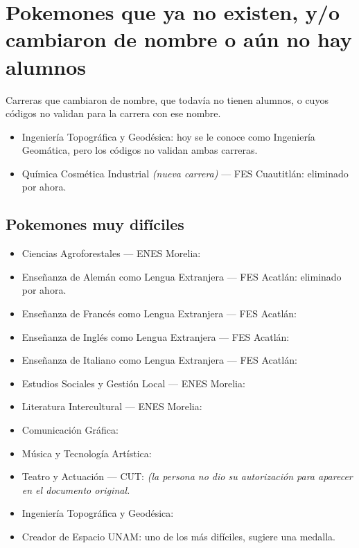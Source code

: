 \section{Pokemones que ya no existen, y/o cambiaron de nombre o aún no hay alumnos}
Carreras que cambiaron de nombre, que todavía no tienen alumnos, o cuyos códigos no validan para la carrera con ese nombre.

\begin{itemize}[leftmargin=*]
  \item Ingeniería Topográfica y Geodésica: hoy se le conoce como Ingeniería Geomática, pero los códigos no validan ambas carreras.
  \item Química Cosmética Industrial \emph{(nueva carrera)} --- FES Cuautitlán: eliminado por ahora.
\end{itemize}

\subsection*{Pokemones muy difíciles}
\begin{itemize}[leftmargin=*]
  \item Ciencias Agroforestales --- ENES Morelia: 
  \item Enseñanza de Alemán como Lengua Extranjera --- FES Acatlán: eliminado por ahora.
  \item Enseñanza de Francés como Lengua Extranjera --- FES Acatlán: 
  \item Enseñanza de Inglés como Lengua Extranjera --- FES Acatlán: 
  \item Enseñanza de Italiano como Lengua Extranjera --- FES Acatlán: 
  \item Estudios Sociales y Gestión Local --- ENES Morelia: 
  \item Literatura Intercultural --- ENES Morelia: 
  \item Comunicación Gráfica: 
  \item Música y Tecnología Artística: 
  \item Teatro y Actuación --- CUT:  \emph{(la persona no dio su autorización para aparecer en el documento original.}
  \item Ingeniería Topográfica y Geodésica: 
  \item Creador de Espacio UNAM: uno de los más difíciles, sugiere una medalla.
\end{itemize}
